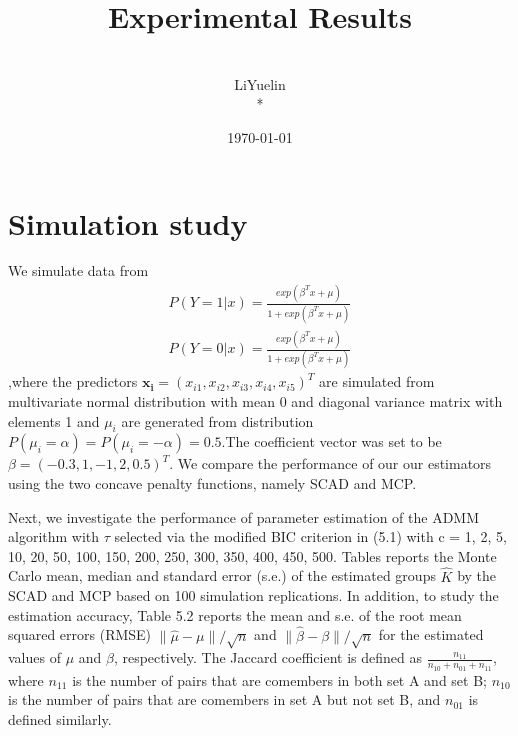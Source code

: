 \documentclass[11pt,onside,a4paper,fleqn]{report}
\title{\bf Experimental Results}  %
\author{ \\ LiYuelin\\*\\}
\date{\today}                           %
\begin{document}
\maketitle                              %
\setcounter{page}{1}                    %
 
\chapter{Simulation study}
\hspace{0.8cm}We simulate data from 
\begin{equation}
    \begin{aligned}
        P(Y = 1|x) = \frac{exp(\beta^{T}x + \mu)}{1 + exp(\beta^{T}x + \mu)} 
        \\P(Y = 0|x) = \frac{exp(\beta^{T}x + \mu)}{1 + exp(\beta^{T}x + \mu)}
    \end{aligned} 
\end{equation}
,where the predictors $\bm{x_{i}} = (x_{i1}, x_{i2}, x_{i3}, x_{i4}, x_{i5})^{T}$ are simulated from multivariate
normal distribution with mean 0 and diagonal variance matrix with elements 1 and $\mu_{i}$ are generated from distribution 
$P(\mu_{i} = \alpha) = P(\mu_{i} = -\alpha) = 0.5$.The coefficient vector was set to be 
$\beta = (-0.3, 1, -1, 2, 0.5)^{T}$. We compare the performance of our our estimators using the two concave penalty
functions, namely SCAD and MCP.

\hspace{0.8cm}Next, we investigate the performance of parameter estimation
of the ADMM algorithm with $\tau$ selected via the modified BIC criterion in (5.1) 
with c = 1, 2, 5, 10, 20, 50, 100, 150, 200, 250, 300, 350, 400, 450, 500. 
Tables reports the Monte Carlo mean, median and standard error (s.e.) of the estimated groups
$\hat{K}$ by the SCAD and MCP based on 100 simulation replications. In
addition, to study the estimation accuracy, Table 5.2 reports the
mean and s.e. of the root mean squared errors (RMSE) $\| \hat{\mu}-\mu\| /\sqrt{n}$
and $\| \hat{\beta}-\beta\| /\sqrt{n}$ for the estimated values of $\mu$ and $\beta$, respectively.
The Jaccard coefficient is defined as $\frac{n_{11}}{n_{10}+n_{01}+n_{11}}$, 
where $n_{11}$ is the number of pairs that are comembers in both set A and set B; $n_{10}$ is the number of pairs that are comembers
in set A but not set B, and $n_{01}$ is defined similarly. 
\end{document}
